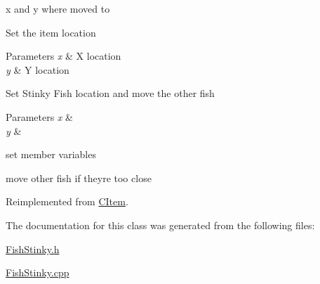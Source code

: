 x and y where moved to 

Set the item location 
\begin{DoxyParams}{Parameters}
{\em x} & X location \\
\hline
{\em y} & Y location\\
\hline
\end{DoxyParams}
Set Stinky Fish location and move the other fish 
\begin{DoxyParams}{Parameters}
{\em x} & \\
\hline
{\em y} & \\
\hline
\end{DoxyParams}
set member variables

move other fish if they\textquotesingle{}re too close 

Reimplemented from \mbox{\hyperlink{class_c_item_a5b76e510670afffe0d1da6bcc6c14547}{C\+Item}}.



The documentation for this class was generated from the following files\+:\begin{DoxyCompactItemize}
\item 
\mbox{\hyperlink{_fish_stinky_8h}{Fish\+Stinky.\+h}}\item 
\mbox{\hyperlink{_fish_stinky_8cpp}{Fish\+Stinky.\+cpp}}\end{DoxyCompactItemize}

